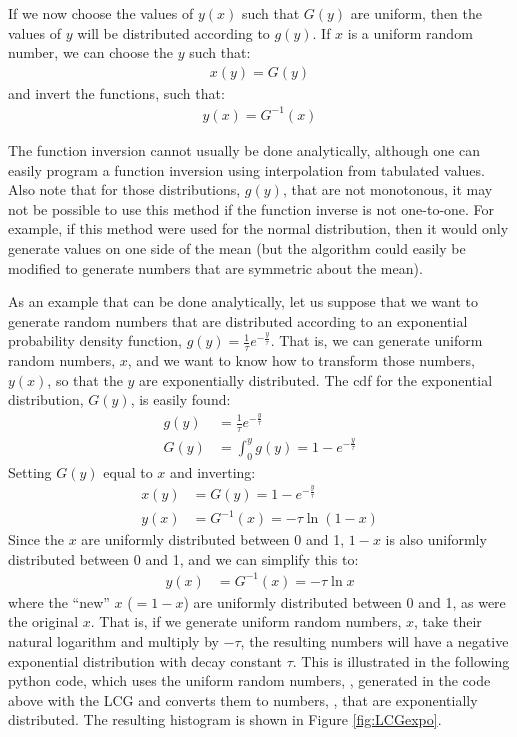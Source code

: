 If we now choose the values of $y(x)$ such that $G(y)$ are uniform, then the values of $y$ will be distributed according to $g(y)$. If $x$ is a uniform random number, we can choose the $y$ such that:
\begin{align*}
x(y) = G(y)
\end{align*}
and invert the functions, such that:
\begin{align*}
y(x) = G^{-1}(x)
\end{align*}

The function inversion cannot usually be done analytically, although one can easily program a function inversion using interpolation from tabulated values. Also note that for those distributions, $g(y)$, that are not monotonous, it may not be possible to use this method if the function inverse is not one-to-one. For example, if this method were used for the normal distribution, then it would only generate values on one side of the mean (but the algorithm could easily be modified to generate numbers that are symmetric about the mean).

As an example that can be done analytically, let us suppose that we want to generate random numbers that are distributed according to an exponential probability density function, $g(y) = \frac{1}{\tau}e^{-\frac{y}{\tau}}$. That is, we can generate uniform random numbers, $x$, and we want to know how to transform those numbers, $y(x)$, so that the $y$ are exponentially distributed. The cdf for the exponential distribution, $G(y)$, is easily found:
\begin{align*}
g(y) &= \frac{1}{\tau}e^{-\frac{y}{\tau}}\nonumber\\
G(y) &= \int_{0}^y g(y) = 1- e^{-\frac{y}{\tau}} 
\end{align*}
Setting $G(y)$ equal to $x$ and inverting:
\begin{align*}
x(y) &= G(y)=1- e^{-\frac{y}{\tau}} \\
y(x) &= G^{-1}(x) = -\tau \ln(1-x) 
\end{align*}
Since the $x$ are uniformly distributed between 0 and 1, $1-x$ is also uniformly distributed between 0 and 1, and we can simplify this to:
\begin{align*}
y(x) &= G^{-1}(x) = -\tau \ln{x} 
\end{align*}
where the ``new'' $x$ ($=1-x$) are uniformly distributed between 0 and 1, as were the original $x$. That is, if we generate uniform random numbers, $x$, take their natural logarithm and multiply by $-\tau$, the resulting numbers will have a negative exponential distribution with decay constant $\tau$. This is illustrated in the following python code, which uses the uniform random numbers, , generated in the code above with the LCG and converts them to numbers, , that are exponentially distributed. The resulting histogram is shown in Figure \ref{fig:LCGexpo}.

